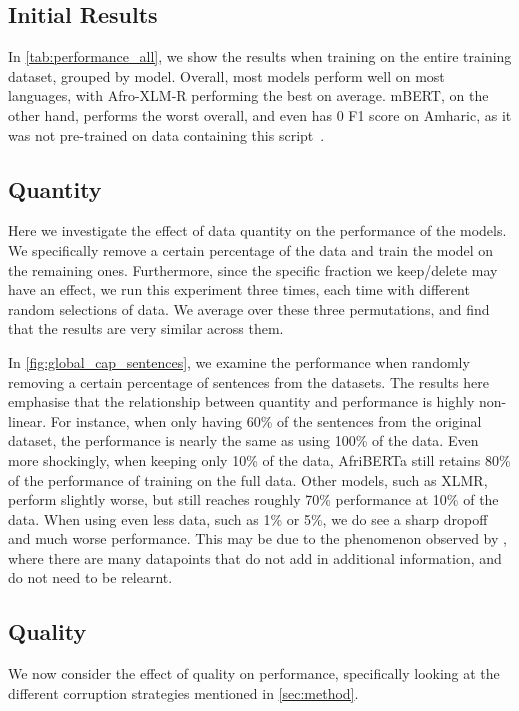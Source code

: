 \documentclass{article}
\newcommand{\mike}[1]{\textcolor{red}{#1}}
\newcommand{\afriberta}{AfriBERTa\xspace}
\newcommand{\afroxlmr}{Afro-XLM-R\xspace}
\begin{document}
\subsection{Initial Results}
In \autoref{tab:performance_all}, we show the results when training on the entire training dataset, grouped by model. Overall, most models perform well on most languages, with \afroxlmr performing the best on average. mBERT, on the other hand, performs the worst overall, and even has 0 F1 score on Amharic, as it was not pre-trained on data containing this script~\citep{adelani2021MasakhaNER}.

\subsection{Quantity}
\label{sec:exp_quantity}
Here we investigate the effect of data quantity on the performance of the models. We specifically remove a certain percentage of the data and train the model on the remaining ones. Furthermore, since the specific fraction we keep/delete may have an effect, we run this experiment three times, each time with different random selections of data. We average over these three permutations, and find that the results are very similar across them.

In \autoref{fig:global_cap_sentences}, we examine the performance when randomly removing a certain percentage of sentences from the datasets. The results here emphasise that the relationship between quantity and performance is highly non-linear.
For instance, when only having 60\% of the sentences from the original dataset, the performance is nearly the same as using 100\% of the data. Even more shockingly, when keeping only 10\% of the data, \afriberta still retains 80\% of the performance of training on the full data. Other models, such as XLMR, perform slightly worse, but still reaches roughly 70\% performance at 10\% of the data. When using even less data, such as 1\% or 5\%, we do see a sharp dropoff and much worse performance. This may be due to the phenomenon observed by \citet{mindermann2022Prioritized}, where there are many datapoints that do not add in additional information, and do not need to be relearnt.


\subsection{Quality}
\label{sec:exp_quality}
We now consider the effect of quality on performance, specifically looking at the different corruption strategies mentioned in \autoref{sec:method}. 
\end{document}

